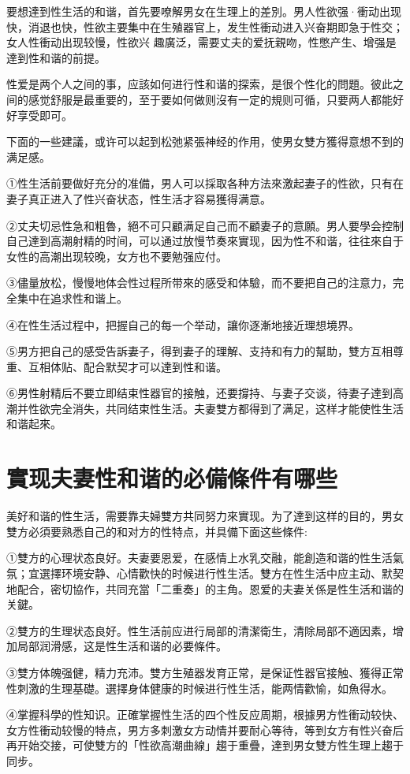 \documentclass[12pt,UTF8]{ctexbook}
\begin{document}
要想達到性生活的和谐，首先要嘹解男女在生理上的差別。男人性欲强·衝动出现快，消退也快，性欲主要集中在生殖器官上，发生性衝动进入兴奋期即急于性交；女人性衝动出现较慢，性欲兴
趣廣泛，需要丈夫的爱抚親吻，性憋产生、增强是達到性和谐的前提。

性爱是两个人之间的事，应該如何进行性和谐的探索，是很个性化的問題。彼此之间的感觉舒服是最重要的，至于要如何做则沒有一定的規则可循，只要两人都能好好享受即可。

下面的一些建議，或许可以起到松弛紧張神经的作用，使男女雙方獲得意想不到的满足感。

①性生活前要做好充分的准備，男人可以採取各种方法來激起妻子的性欲，只有在妻子真正进入了性兴奋状态，性生活才容易獲得满意。

②丈夫切忌性急和粗魯，絕不可只顧满足自己而不顧妻子的意願。男人要學会控制自己達到高潮射精的时间，可以通过放慢节奏來實现，因为性不和谐，往往來自于女性的高潮出现较晚，女方也不要勉强应付。

③儘量放松，慢慢地体会性过程所带來的感受和体驗，而不要把自己的注意力，完全集中在追求性和谐上。

④在性生活过程中，把握自己的每一个举动，讓你逐漸地接近理想境界。

⑤男方把自己的感受告訴妻子，得到妻子的理解、支持和有力的幫助，雙方互相尊重、互相体贴、配合默契才可以達到性和谐。

⑥男性射精后不要立即结束性器官的接触，还要撐持、与妻子交谈，待妻子達到高潮并性欲完全消失，共同结束性生活。夫妻雙方都得到了满足，这样才能使性生活和谐起來。

\section{實现夫妻性和谐的必備條件有哪些}

美好和谐的性生活，需要靠夫婦雙方共同努力來實现。为了達到这样的目的，男女雙方必須要熟悉自己的和对方的性特点，并具備下面这些條件:

①雙方的心理状态良好。夫妻要恩爱，在感情上水乳交融，能創造和谐的性生活氣氛；宜選擇环境安静、心情歡快的时候进行性生活。雙方在性生活中应主动、默契地配合，密切協作，共同充當「二重奏」的主角。恩爱的夫妻关係是性生活和谐的关鍵。

②雙方的生理状态良好。性生活前应进行局部的清潔衛生，清除局部不適因素，增加局部润滑感，这是性生活和谐的必要條件。

③雙方体魄强健，精力充沛。雙方生殖器发育正常，是保证性器官接触、獲得正常性刺激的生理基礎。選擇身体健康的时候进行性生活，能两情歡愉，如魚得水。

④掌握科學的性知识。正確掌握性生活的四个性反应周期，根據男方性衝动较快、女方性衝动较慢的特点，男方多刺激女方动情并要耐心等待，等到女方有性兴奋后再开始交接，可使雙方的「性欲高潮曲線」趨于重疊，達到男女雙方性生理上趨于同步。
\end{document}
